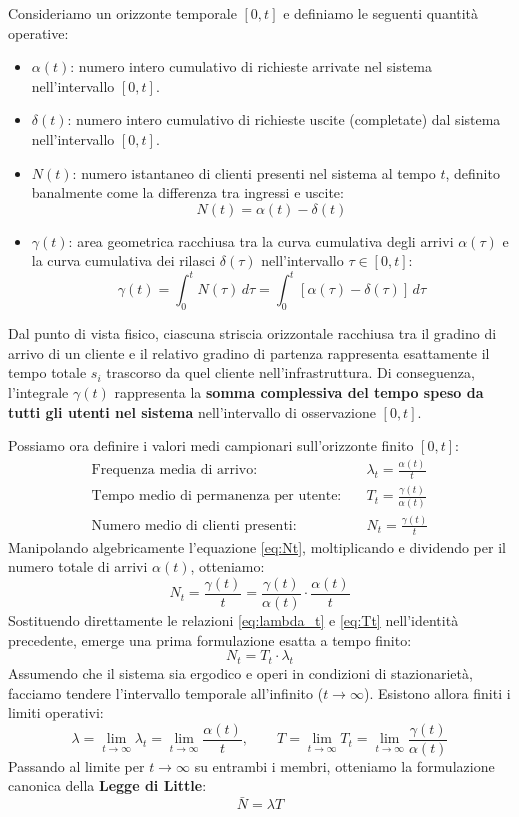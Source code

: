 \documentclass[11pt, a4paper]{article}
\begin{document}
Consideriamo un orizzonte temporale $[0, t]$ e definiamo le seguenti quantità operative:
\begin{itemize}[leftmargin=*]
    \item $\alpha(t)$: numero intero cumulativo di richieste arrivate nel sistema nell'intervallo $[0, t]$.
    \item $\delta(t)$: numero intero cumulativo di richieste uscite (completate) dal sistema nell'intervallo $[0, t]$.
    \item $N(t)$: numero istantaneo di clienti presenti nel sistema al tempo $t$, definito banalmente come la differenza tra ingressi e uscite:
    \[
        N(t) = \alpha(t) - \delta(t)
    \]
    \item $\gamma(t)$: area geometrica racchiusa tra la curva cumulativa degli arrivi $\alpha(\tau)$ e la curva cumulativa dei rilasci $\delta(\tau)$ nell'intervallo $\tau \in [0, t]$:
    \[
        \gamma(t) = \int_0^t N(\tau)\,d\tau = \int_0^t [\alpha(\tau) - \delta(\tau)]\,d\tau
    \]
\end{itemize}
Dal punto di vista fisico, ciascuna striscia orizzontale racchiusa tra il gradino di arrivo di un cliente e il relativo gradino di partenza rappresenta esattamente il tempo totale $s_i$ trascorso da quel cliente nell'infrastruttura. Di conseguenza, l'integrale $\gamma(t)$ rappresenta la \textbf{somma complessiva del tempo speso da tutti gli utenti nel sistema} nell'intervallo di osservazione $[0, t]$.

Possiamo ora definire i valori medi campionari sull'orizzonte finito $[0, t]$:
\begin{align}
    \text{Frequenza media di arrivo:} \quad &\lambda_t = \frac{\alpha(t)}{t} \label{eq:lambda_t} \\
    \text{Tempo medio di permanenza per utente:} \quad &T_t = \frac{\gamma(t)}{\alpha(t)} \label{eq:Tt} \\
    \text{Numero medio di clienti presenti:} \quad &N_t = \frac{\gamma(t)}{t} \label{eq:Nt}
\end{align}
Manipolando algebricamente l'equazione \eqref{eq:Nt}, moltiplicando e dividendo per il numero totale di arrivi $\alpha(t)$, otteniamo:
\[
    N_t = \frac{\gamma(t)}{t} = \frac{\gamma(t)}{\alpha(t)} \cdot \frac{\alpha(t)}{t}
\]
Sostituendo direttamente le relazioni \eqref{eq:lambda_t} e \eqref{eq:Tt} nell'identità precedente, emerge una prima formulazione esatta a tempo finito:
\[
    N_t = T_t \cdot \lambda_t
\]
Assumendo che il sistema sia ergodico e operi in condizioni di stazionarietà, facciamo tendere l'intervallo temporale all'infinito ($t \to \infty$). Esistono allora finiti i limiti operativi:
\[
    \lambda = \lim_{t \to \infty} \lambda_t = \lim_{t \to \infty} \frac{\alpha(t)}{t}, \qquad T = \lim_{t \to \infty} T_t = \lim_{t \to \infty} \frac{\gamma(t)}{\alpha(t)}
\]
Passando al limite per $t \to \infty$ su entrambi i membri, otteniamo la formulazione canonica della \textbf{Legge di Little}:
\[
    \boxed{\bar{N} = \lambda T}
\]
\end{document}
